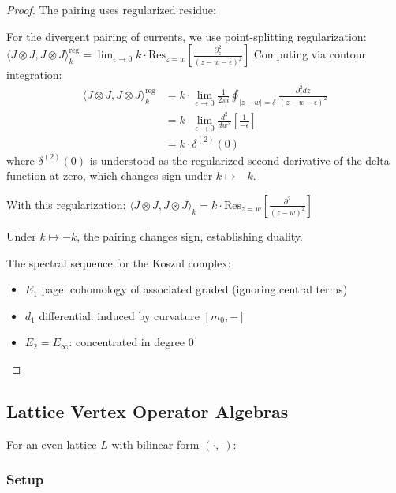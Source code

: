 \begin{proof}
The pairing uses regularized residue:

\begin{definition}\label{def:regularization}
For the divergent pairing of currents, we use point-splitting regularization:
$\langle J \otimes J, J \otimes J \rangle_k^{\text{reg}} = \lim_{\epsilon \to 0} k \cdot \text{Res}_{z=w}\left[\frac{\partial_z^2}{(z-w-\epsilon)^2}\right]$
Computing via contour integration:
\begin{align}
\langle J \otimes J, J \otimes J \rangle_k^{\text{reg}} &= k \cdot \lim_{\epsilon \to 0} \frac{1}{2\pi i} \oint_{|z-w|=\delta} \frac{\partial_z^2 dz}{(z-w-\epsilon)^2}\\
&= k \cdot \lim_{\epsilon \to 0} \frac{d^2}{dw^2}\left[\frac{1}{-\epsilon}\right]\\
&= k \cdot \delta^{(2)}(0)
\end{align}
where $\delta^{(2)}(0)$ is understood as the regularized second derivative of the delta function at zero, which changes sign under $k \mapsto -k$.
\end{definition}

With this regularization:
$\langle J \otimes J, J \otimes J \rangle_k = k \cdot \text{Res}_{z=w}\left[\frac{\partial^2}{(z - w)^2}\right]$

Under $k \mapsto -k$, the pairing changes sign, establishing duality.

The spectral sequence for the Koszul complex:
\begin{itemize}
\item $E_1$ page: cohomology of associated graded (ignoring central terms)
\item $d_1$ differential: induced by curvature $[m_0, -]$
\item $E_2 = E_\infty$: concentrated in degree 0
\end{itemize}
\end{proof}
 
\subsection{Lattice Vertex Operator Algebras}
 
For an even lattice $L$ with bilinear form $(\cdot, \cdot)$:
 
\subsubsection{Setup}
 

